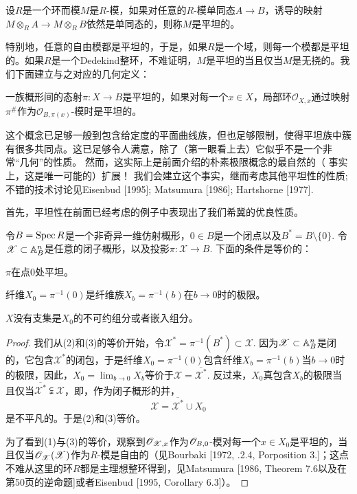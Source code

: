 \begin{defi}
	设$R$是一个环而模$M$是$R$\hyp 模，如果对任意的$R$\hyp 模单同态$A\to B$，诱导的映射$M\otimes_R A\to M\otimes_R B$依然是单同态的，则称$M$是平坦的。
\end{defi}

特别地，任意的自由模都是平坦的，于是，如果$R$是一个域，则每一个模都是平坦的。如果$R$是一个Dedekind整环，不难证明，$M$是平坦的当且仅当$M$是无挠的。我们下面建立与之对应的几何定义：

\begin{defi}
	一族概形间的态射$\pi:X\to B$是平坦的，如果对每一个$x\in X$，局部环$\mathscr{O}_{X,x}$通过映射$\pi^\#$作为$\mathscr{O}_{B,\pi(x)}$\hyp 模时是平坦的。
\end{defi}

这个概念已足够一般到包含给定度的平面曲线族，但也足够限制，使得平坦族中簇有很多共同点。这已足够令人满意，除了（第一眼看上去）它似乎不是一个非常“几何”的性质。 然而，这实际上是前面介绍的朴素极限概念的最自然的（ 事实上，这是唯一可能的）扩展！ 我们会建立这个事实，继而考虑其他平坦性的性质; 不错的技术讨论见Eisenbud [1995]; Matsumura [1986]; Hartshorne [1977]. \nottran

首先，平坦性在前面已经考虑的例子中表现出了我们希冀的优良性质。

\begin{pro}\label{pro:2.29}
	令$B=\operatorname{Spec} R$是一个非奇异一维仿射概形，$0\in B$是一个闭点以及$B^*=B\setminus \{0\}$. 令$\mathscr{X}\subset \mathbb{A}_{B}^n$是任意的闭子概形，以及投影$\pi:\mathscr{X}\to B$. 下面的条件是等价的：
	\begin{compactenum}[\((1)\)]
		\item $\pi$在点$0$处平坦。
		\item 纤维$X_0=\pi^{-1}(0)$是纤维族$X_b=\pi^{-1}(b)$在$b\to 0$时的极限。
		\item $X$没有支集是$X_0$的不可约组分或者嵌入组分。
	\end{compactenum}
\end{pro}

\begin{proof}
我们从(2)和(3)的等价开始，令$\mathscr{X}^*=\pi^{-1}(B^*)\subset \mathscr{X}$. 因为$\mathscr{X}\subset \mathbb{A}_B^n$是闭的，它包含$\mathscr{X}^*$的闭包，于是纤维$X_0=\pi^{-1}(0)$包含纤维$X_b=\pi^{-1}(b)$当$b\to 0$时的极限，因此，$X_0=\lim_{b\to 0} X_b$等价于$\mathscr{X}=\overline{\mathscr{X}^*}$. 反过来，$X_0$真包含$X_b$的极限当且仅当$\overline{\mathscr{X}^*} \subsetneqq \mathscr{X}$，即，作为闭子概形的并，
\[
	\mathscr{X}=\overline{\mathscr{X}^*}\cup X_0
\]
是不平凡的。于是(2)和(3)等价。

为了看到(1)与(3)的等价，观察到$\mathscr{O}_{\mathscr{X},x}$作为$\mathscr{O}_{B,0}$\hyp 模对每一个$x\in X_0$是平坦的，当且仅当$\mathscr{O}_{\mathscr{X}}(\mathscr{X})$作为$R$\hyp 模是自由的（见Bourbaki [1972, \uppercase\expandafter{}.2.4, Porposition 3.\expandafter{}]；这点不难从这里的环$R$都是主理想整环得到，见Matsumura [1986, Theorem 7.6以及在第50页的逆命题]或者Eisenbud [1995, Corollary 6.3]）。
\end{proof}

